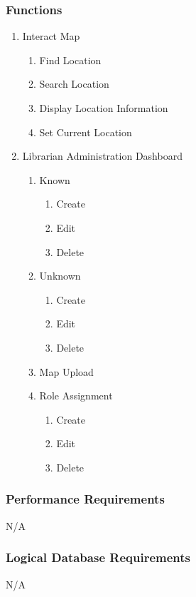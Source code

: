 \documentclass[letterpaper,10pt,titlepage]{article}
\begin{document}
\subsubsection{Functions}
\begin{enumerate}
	\item Interact Map
    \begin{enumerate}
    	\item Find Location
		\item Search Location
		\item Display Location Information
		\item Set Current Location
    \end{enumerate}
    \item Librarian Administration Dashboard
    \begin{enumerate}
      \item Known
      \begin{enumerate}
          \item Create
          \item Edit
          \item Delete
      \end{enumerate}
      \item Unknown
      \begin{enumerate}
          \item Create
          \item Edit
          \item Delete
      \end{enumerate}
      \item Map Upload 
      \item Role Assignment
      \begin{enumerate}
          \item Create
          \item Edit
          \item Delete
      \end{enumerate}
    \end{enumerate}
\end{enumerate}

\subsubsection{Performance Requirements}
N/A

\subsubsection{Logical Database Requirements}
N/A
\end{document}
